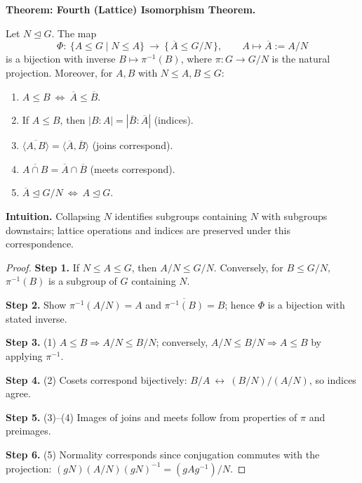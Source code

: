 \documentclass[9pt]{article}
\theoremstyle{definition}
\begin{document}
\newpage


\noindent\textbf{Theorem: Fourth (Lattice) Isomorphism Theorem.}

\newpage

Let $N\trianglelefteq G$. The map
\[
\Phi:\ \{A\le G\mid N\le A\}\ \longrightarrow\ \{\,\overline{A}\le G/N\,\},\qquad A\mapsto \overline{A}:=A/N
\]
is a bijection with inverse $B\mapsto \pi^{-1}(B)$, where $\pi:G\to G/N$ is the natural projection. Moreover, for $A,B$ with $N\le A,B\le G$:
\begin{enumerate}
  \item $A\le B\ \iff\ \overline{A}\le \overline{B}$.
  \item If $A\le B$, then $|B:A|=|\overline{B}:\overline{A}|$ (indices).
  \item $\overline{\langle A,B\rangle}=\langle \overline{A},\overline{B}\rangle$ (joins correspond).
  \item $\overline{A\cap B}=\overline{A}\cap \overline{B}$ (meets correspond).
  \item $\overline{A}\trianglelefteq G/N\ \iff\ A\trianglelefteq G$.
\end{enumerate}

\dotfill

\noindent\textbf{Intuition.}
Collapsing $N$ identifies subgroups containing $N$ with subgroups downstairs; lattice operations and indices are preserved under this correspondence.

\dotfill

\begin{proof}
\textbf{Step 1.} If $N\le A\le G$, then $A/N\le G/N$. Conversely, for $B\le G/N$, $\pi^{-1}(B)$ is a subgroup of $G$ containing $N$.

\textbf{Step 2.} Show $\pi^{-1}(A/N)=A$ and $\overline{\pi^{-1}(B)}=B$; hence $\Phi$ is a bijection with stated inverse.

\textbf{Step 3.} (1) $A\le B\Rightarrow A/N\le B/N$; conversely, $A/N\le B/N\Rightarrow A\le B$ by applying $\pi^{-1}$.

\textbf{Step 4.} (2) Cosets correspond bijectively: $B/A\ \leftrightarrow\ (B/N)/(A/N)$, so indices agree.

\textbf{Step 5.} (3)–(4) Images of joins and meets follow from properties of $\pi$ and preimages.

\textbf{Step 6.} (5) Normality corresponds since conjugation commutes with the projection: $(gN)(A/N)(gN)^{-1}=(gAg^{-1})/N$.
\end{proof}
\end{document}
